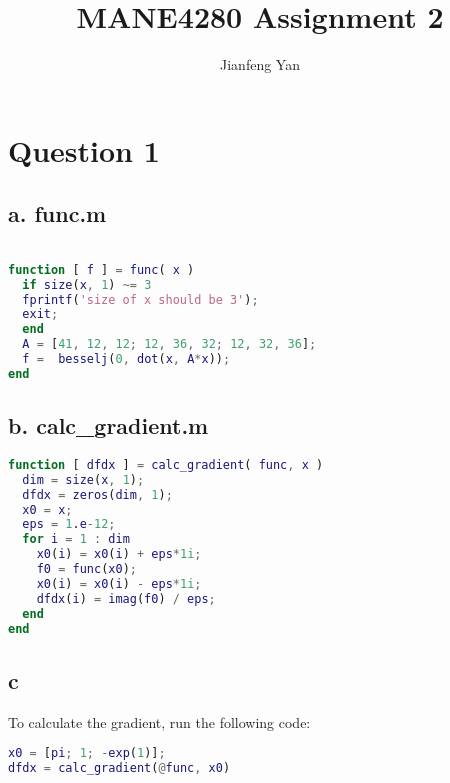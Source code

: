 \documentclass[a4paper]{article}
\title{MANE4280 Assignment 2}
\author{Jianfeng Yan}
\begin{document}
 \maketitle
 
\section*{Question 1}
\subsection*{a. func.m}
\begin{lstlisting}[language=Matlab, 
                   keywordstyle=\color{blue},
                   stringstyle=\color{red},
                   commentstyle=\color{green}]

function [ f ] = func( x )
  if size(x, 1) ~= 3
  fprintf('size of x should be 3');
  exit;
  end
  A = [41, 12, 12; 12, 36, 32; 12, 32, 36];
  f =  besselj(0, dot(x, A*x));
end
\end{lstlisting}
\subsection*{b. calc\_gradient.m}
\begin{lstlisting}[language=Matlab, 
                   keywordstyle=\color{blue},
                   stringstyle=\color{red},
                   commentstyle=\color{green}]
function [ dfdx ] = calc_gradient( func, x )
  dim = size(x, 1);
  dfdx = zeros(dim, 1);
  x0 = x;
  eps = 1.e-12;
  for i = 1 : dim
    x0(i) = x0(i) + eps*1i;
    f0 = func(x0);
    x0(i) = x0(i) - eps*1i;
    dfdx(i) = imag(f0) / eps;
  end
end
\end{lstlisting}

\subsection*{c}
To calculate the gradient, run the following code:
\begin{lstlisting}[language=Matlab, 
                   keywordstyle=\color{blue},
                   stringstyle=\color{red},
                   commentstyle=\color{green}]
x0 = [pi; 1; -exp(1)];
dfdx = calc_gradient(@func, x0)
\end{lstlisting}
\end{document}
